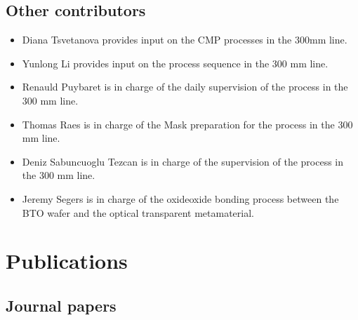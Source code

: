 \documentclass[a4paper,10pt,english,openany,oneside]{jupyterBook}
\begin{document}
\section{Other contributors}
\label{\detokenize{Team:other-contributors}}\begin{itemize}
\item {} 
\sphinxAtStartPar
Diana Tsvetanova provides input on the CMP processes in the 300mm line.

\item {} 
\sphinxAtStartPar
Yunlong Li provides input on the process sequence in the 300 mm line.

\item {} 
\sphinxAtStartPar
Renauld Puybaret is in charge of the daily supervision of the process in the 300 mm line.

\item {} 
\sphinxAtStartPar
Thomas Raes is in charge of the Mask preparation for the process in the 300 mm line.

\item {} 
\sphinxAtStartPar
Deniz Sabuncuoglu Tezcan is in charge of the supervision of the process in the 300 mm line.

\item {} 
\sphinxAtStartPar
Jeremy Segers is in charge of the oxide\sphinxhyphen{}oxide bonding process between the BTO wafer and the optical transparent metamaterial.

\end{itemize}

\sphinxstepscope


\chapter{Publications}
\label{\detokenize{Publications:publications}}\label{\detokenize{Publications::doc}}

\section{Journal papers}
\label{\detokenize{Publications:journal-papers}}
\end{document}
